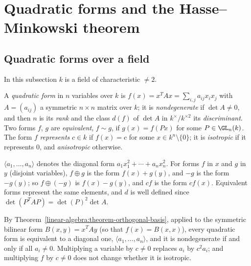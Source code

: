 \section{Quadratic forms and the Hasse--Minkowski theorem}\label{p-adic-numbers:section-hasse-minkowski}

\subsection{Quadratic forms over a field}\label{p-adic-numbers:subsection-quadratic-forms}

In this subsection $k$ is a field of characteristic $\neq 2$.

\begin{definition}\label{p-adic-numbers:definition-quadratic-form}
A \emph{quadratic form} in $n$ variables over $k$ is $f(x) = x^TAx = \sum_{i,j}a_{ij}x_ix_j$ with $A = (a_{ij})$ a symmetric $n \times n$ matrix over $k$; it is \emph{nondegenerate} if $\det A \neq 0$, and then
$n$ is its \emph{rank} and the class $d(f)$ of $\det A$ in $k^\times/k^{\times2}$ its \emph{discriminant}. Two forms $f$, $g$ are \emph{equivalent}, $f \sim g$, if $g(x) = f(Px)$ for some $P \in \GL_n(k)$. The
form $f$ \emph{represents} $c \in k$ if $f(x) = c$ for some $x \in k^n \setminus \{0\}$; it is \emph{isotropic} if it represents $0$, and \emph{anisotropic} otherwise.
\end{definition}

\begin{notation}\label{p-adic-numbers:notation-quadratic-forms}
$\langle a_1, \ldots, a_n\rangle$ denotes the diagonal form $a_1x_1^2 + \cdots + a_nx_n^2$. For forms $f$ in $x$ and $g$ in $y$ (disjoint variables), $f \oplus g$ is the form $f(x) + g(y)$, and $-g$ is the form
$-g(y)$; so $f \oplus (-g)$ is $f(x) - g(y)$, and $cf$ is the form $c f(x)$. Equivalent forms represent the same elements, and $d$ is well defined since $\det(P^TAP) = \det(P)^2\det A$.
\end{notation}

By Theorem~\ref{linear-algebra:theorem-orthogonal-basis}, applied to the symmetric bilinear form $B(x, y) = x^TAy$ (so that $f(x) = B(x, x)$), every quadratic form is equivalent to a diagonal one,
$\langle a_1, \ldots, a_n\rangle$, and it is nondegenerate if and only if all $a_i \neq 0$. Multiplying a variable by $c \neq 0$ replaces $a_i$ by $c^2a_i$; and multiplying $f$ by $c \neq 0$ does not change whether it
is isotropic.

